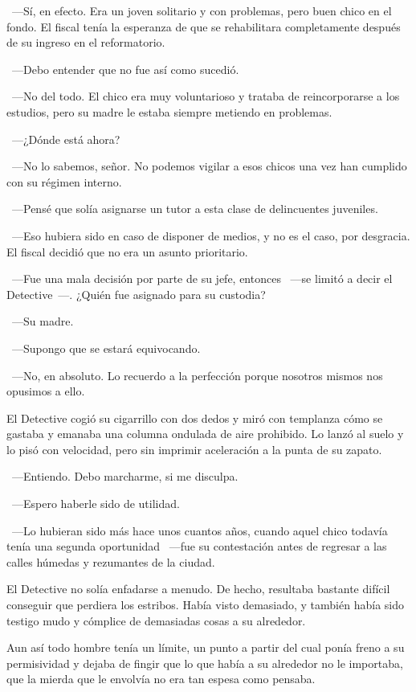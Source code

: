 ~---Sí, en efecto. Era un joven solitario y con problemas, pero buen chico en el fondo. El fiscal tenía la esperanza de que se rehabilitara completamente después de su ingreso en el reformatorio.

~---Debo entender que no fue así como sucedió.

~---No del todo. El chico era muy voluntarioso y trataba de reincorporarse a los estudios, pero su madre le estaba siempre metiendo en problemas.

~---¿Dónde está ahora?

~---No lo sabemos, señor. No podemos vigilar a esos chicos una vez han cumplido con su régimen interno.

~---Pensé que solía asignarse un tutor a esta clase de delincuentes juveniles.

~---Eso hubiera sido en caso de disponer de medios, y no es el caso, por desgracia. El fiscal decidió que no era un asunto prioritario.

~---Fue una mala decisión por parte de su jefe, entonces ~---se limitó a decir el Detective~---. ¿Quién fue asignado para su custodia?

~---Su madre.

~---Supongo que se estará equivocando.

~---No, en absoluto. Lo recuerdo a la perfección porque nosotros mismos nos opusimos a ello.

El Detective cogió su cigarrillo con dos dedos y miró con templanza cómo se gastaba y emanaba una columna ondulada de aire prohibido. Lo lanzó al suelo y lo pisó con velocidad, pero sin imprimir aceleración a la punta de su zapato.

~---Entiendo. Debo marcharme, si me disculpa.

~---Espero haberle sido de utilidad.

~---Lo hubieran sido más hace unos cuantos años, cuando aquel chico todavía tenía una segunda oportunidad ~---fue su contestación antes de regresar a las calles húmedas y rezumantes de la ciudad.

\parbreak
El Detective no solía enfadarse a menudo. De hecho, resultaba bastante difícil conseguir que perdiera los estribos. Había visto demasiado, y también había sido testigo mudo y cómplice de demasiadas cosas a su alrededor.

Aun así todo hombre tenía un límite, un punto a partir del cual ponía freno a su permisividad y dejaba de fingir que lo que había a su alrededor no le importaba, que la mierda que le envolvía no era tan espesa como pensaba.


